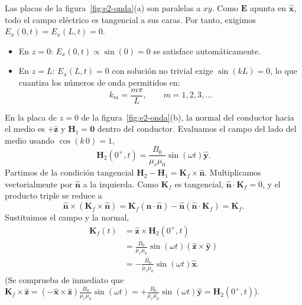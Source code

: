 \documentclass[11pt]{article}
\begin{document}
Las placas de la figura~\ref{fig:e2-onda}(a) son paralelas a
$xy$. Como $\mathbf E$ apunta en $\hat{\mathbf x}$, todo el campo
eléctrico es tangencial a sus caras. Por tanto, exigimos
$E_x(0,t)=E_x(L,t)=0$.
\begin{itemize}
    \item En $z = 0$: $E_x(0,t) \propto \sin(0) = 0$ se satisface automáticamente.
    \item En $z = L$: $E_x(L,t) = 0$ con solución no trivial exige $\sin(kL) = 0$, lo que cuantiza los números de onda permitidos en:
    \begin{equation}
        k_m = \frac{m \pi}{L}, \qquad m = 1, 2, 3, \dots
    \end{equation}
\end{itemize}
En la placa de $z=0$ de la figura~\ref{fig:e2-onda}(b), la normal
del conductor hacia el medio es $+\hat{\mathbf z}$ y
$\mathbf H_1=\mathbf0$ dentro del conductor. Evaluamos el campo
del lado del medio usando $\cos(k\,0)=1$,
\[
    \mathbf H_2(0^+,t)=\frac{B_0}{\mu_r\mu_0}
                           \sin(\omega t)\hat{\mathbf y}.
\]
Partimos de la condición tangencial
$\mathbf H_2-\mathbf H_1=\mathbf K_f\times\hat{\mathbf n}$.
Multiplicamos vectorialmente por $\hat{\mathbf n}$ a la izquierda.
Como $\mathbf K_f$ es tangencial, $\hat{\mathbf n}\cdot\mathbf K_f=0$,
y el producto triple se reduce a
\[
    \hat{\mathbf n}\times(\mathbf K_f\times\hat{\mathbf n})
    =\mathbf K_f(\hat{\mathbf n}\cdot\hat{\mathbf n})
       -\hat{\mathbf n}(\hat{\mathbf n}\cdot\mathbf K_f)
    =\mathbf K_f.
\]
Sustituimos el campo y la normal,
\begin{align*}
    \mathbf K_f(t)
    &=\hat{\mathbf z}\times\mathbf H_2(0^+,t)\\
    &=\frac{B_0}{\mu_r\mu_0}\sin(\omega t)
       (\hat{\mathbf z}\times\hat{\mathbf y})\\
    &=-\frac{B_0}{\mu_r\mu_0}\sin(\omega t)\hat{\mathbf x}.
\end{align*}
(Se comprueba de inmediato que $\mathbf{K}_f \times \hat{\mathbf{z}} = (-\hat{\mathbf{x}} \times \hat{\mathbf{z}})\frac{B_0}{\mu_r \mu_0}\sin(\omega t) = +\frac{B_0}{\mu_r \mu_0}\sin(\omega t)\hat{\mathbf{y}} = \mathbf{H}_2(0^+,t)$).
\end{document}
